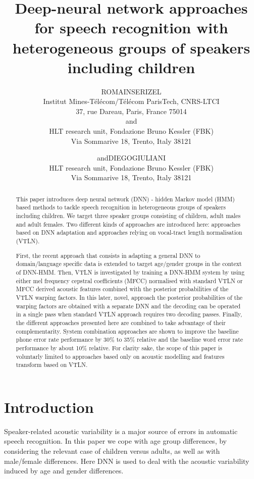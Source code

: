 \documentclass{nle}
\title[DNN approaches for ASR with heterogeneous groups of speakers]{Deep-neural network approaches for speech recognition with heterogeneous groups of speakers including children}
\author[Romain Serizel and Diego Giuliani]{R\ls O\ls M\ls A\ls I\ls N\ns S\ls E\ls R\ls I\ls Z\ls E\ls L\\
Institut Mines-Télécom/Télécom ParisTech, CNRS-LTCI\\
37, rue Dareau, Paris, France 75014\\
and \\
HLT research unit, Fondazione Bruno Kessler (FBK)\\
Via Sommarive 18, Trento, Italy 38121
\and
and\ns D\ls I\ls E\ls G\ls O\ns G\ls I\ls U\ls L\ls I\ls A\ls N\ls I\\
HLT research unit, Fondazione Bruno Kessler (FBK)\\
Via Sommarive 18, Trento, Italy 38121}
\begin{document}
\label{firstpage}
\maketitle
\begin{abstract} %
This paper introduces deep neural network  (DNN) -  hidden  Markov model (HMM) based methods to tackle speech recognition in heterogeneous groups of speakers including children. We target three speaker groups consisting of children, adult males and adult females. Two different kinds of approaches are introduced here: approaches based on DNN adaptation and approaches relying on vocal-tract length normalisation (VTLN).

First, the recent approach that consists
in adapting a general DNN to domain/language specific data is extended
to target  age/gender groups  in the context  of DNN-HMM. Then, VTLN is investigated by training a DNN-HMM system by using either mel frequency cepstral coefficients (MFCC) normalised with standard VTLN or MFCC derived acoustic features combined with the posterior probabilities of the VTLN warping factors. In this later, novel, approach the posterior probabilities of the warping factors are obtained with a separate DNN and the decoding can be operated in a single pass when standard VTLN approach requires two decoding passes. Finally, the different approaches presented here are combined to take advantage of their complementarity. System combination approaches are shown to improve the baseline phone error rate performance by 30\% to 35\% relative and the baseline word error rate performance by about 10\% relative. For clarity sake, the scope of this paper is voluntarly limited to approaches based only on acoustic modelling and features transform based on VTLN.
\end{abstract}

\section{Introduction}
Speaker-related  acoustic variability is a major  source of
errors in automatic  speech recognition.  In this  paper we cope
with  age  group differences,  by  considering  the  relevant case  of
children versus adults, as well as with male/female differences. 
Here DNN is used to deal with the acoustic variability induced by  age and gender differences.
\end{document}
